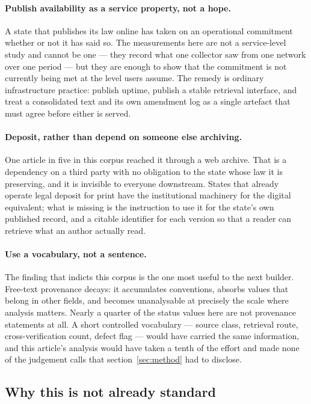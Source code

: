 \documentclass[11pt]{article}
\begin{document}
\paragraph{Publish availability as a service property, not a hope.} A state
that publishes its law online has taken on an operational commitment whether or
not it has said so. The measurements here are not a service-level study and
cannot be one --- they record what one collector saw from one network over one
period --- but they are enough to show that the commitment is not currently
being met at the level users assume. The remedy is ordinary infrastructure
practice: publish uptime, publish a stable retrieval interface, and treat a
consolidated text and its own amendment log as a single artefact that must
agree before either is served.

\paragraph{Deposit, rather than depend on someone else archiving.} One article
in five in this corpus reached it through a web archive. That is a dependency
on a third party with no obligation to the state whose law it is preserving,
and it is invisible to everyone downstream. States that already operate legal
deposit for print have the institutional machinery for the digital equivalent;
what is missing is the instruction to use it for the state's own published
record, and a citable identifier for each version so that a reader can retrieve
what an author actually read.

\paragraph{Use a vocabulary, not a sentence.} The finding that indicts this
corpus is the one most useful to the next builder. Free-text provenance decays:
it accumulates conventions, absorbs values that belong in other fields, and
becomes unanalysable at precisely the scale where analysis matters. Nearly a
quarter of the status values here are not provenance statements at all. A short
controlled vocabulary --- source class, retrieval route, cross-verification
count, defect flag --- would have carried the same information, and this
article's analysis would have taken a tenth of the effort and made none of the
judgement calls that section~\ref{sec:method} had to disclose.

\subsection{Why this is not already standard}
\end{document}
